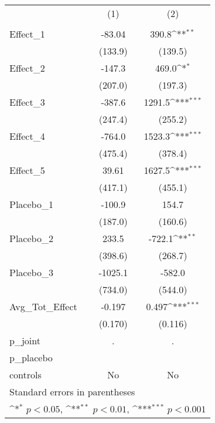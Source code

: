 {
\def\sym#1{\ifmmode^{#1}\else\(^{#1}\)\fi}
\begin{tabular}{l*{2}{c}}
\toprule
            &\multicolumn{1}{c}{(1)}&\multicolumn{1}{c}{(2)}\\
            &\multicolumn{1}{c}{} &\multicolumn{1}{c}{} \\
\midrule
Effect\_1    &      -83.04         &       390.8\sym{**} \\
            &     (133.9)         &     (139.5)         \\
\addlinespace
Effect\_2    &      -147.3         &       469.0\sym{*}  \\
            &     (207.0)         &     (197.3)         \\
\addlinespace
Effect\_3    &      -387.6         &      1291.5\sym{***}\\
            &     (247.4)         &     (255.2)         \\
\addlinespace
Effect\_4    &      -764.0         &      1523.3\sym{***}\\
            &     (475.4)         &     (378.4)         \\
\addlinespace
Effect\_5    &       39.61         &      1627.5\sym{***}\\
            &     (417.1)         &     (455.1)         \\
\addlinespace
Placebo\_1   &      -100.9         &       154.7         \\
            &     (187.0)         &     (160.6)         \\
\addlinespace
Placebo\_2   &       233.5         &      -722.1\sym{**} \\
            &     (398.6)         &     (268.7)         \\
\addlinespace
Placebo\_3   &     -1025.1         &      -582.0         \\
            &     (734.0)         &     (544.0)         \\
\addlinespace
Avg\_Tot\_Effect&      -0.197         &       0.497\sym{***}\\
            &     (0.170)         &     (0.116)         \\
\midrule
p\_joint     &           .         &           .         \\
p\_placebo   &                     &                     \\
controls    &          No         &          No         \\
\bottomrule
\multicolumn{3}{l}{\footnotesize Standard errors in parentheses}\\
\multicolumn{3}{l}{\footnotesize \sym{*} \(p<0.05\), \sym{**} \(p<0.01\), \sym{***} \(p<0.001\)}\\
\end{tabular}
}
